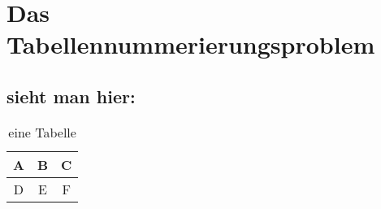 \documentclass[a4paper,
11pt,
BCOR10.00mm,
oneside,
DIV10,
headinclude,footinclude=false
]{scrbook}
\begin{document}
\chapter{Das Tabellennummerierungsproblem}
\section{sieht man hier:}

\begin{table}
        \centering
        \caption{eine Tabelle}
        \label{einTab}
                \begin{tabular}{ccc}
                \toprule
                        A & B & C \\
                \midrule
                        D & E & F \\
                \bottomrule        
                \end{tabular}
\end{table}
        

\begin{table}[htbp]
        \begin{center}
        \caption{mehrere Tabellen}
        \label{Tabs}
\vspace{0.25cm}
\noindent%

 
\vspace{2.5cm}

        \end{center}
\end{table}
\end{document}
